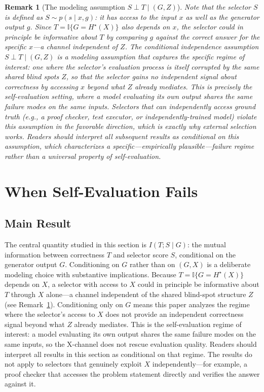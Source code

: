 \documentclass[11pt]{article}
\newtheorem{remark}[theorem]{Remark}
\begin{document}
\begin{remark}[The modeling assumption $S \perp T \mid (G, Z)$]
\label{rem:ci_assumption}
Note that the selector $S$ is defined as $S \sim p(s \mid x, g)$: it has access to the
input $x$ as well as the generator output $g$. Since $T = \mathbb{I}\{G = H^\star(X)\}$
also depends on $x$, the selector could in principle be informative about $T$ by comparing
$g$ against the correct answer for the specific $x$---a channel independent of $Z$. The
conditional independence assumption $S \perp T \mid (G, Z)$ is a \emph{modeling assumption}
that captures the specific regime of interest: one where the selector's evaluation process
is itself corrupted by the same shared blind spots $Z$, so that the selector gains no
independent signal about correctness by accessing $x$ beyond what $Z$ already mediates.
This is precisely the self-evaluation setting, where a model evaluating its own output
shares the same failure modes on the same inputs. Selectors that can independently access
ground truth (e.g., a proof checker, test executor, or independently-trained model) violate
this assumption in the favorable direction, which is exactly why external selection works.
Readers should interpret all subsequent results as conditional on this assumption, which
characterizes a specific---empirically plausible---failure regime rather than a universal
property of self-evaluation.
\end{remark}

\section{When Self-Evaluation Fails}
\label{sec:self_eval_fails}

\subsection{Main Result}

The central quantity studied in this section is $I(T; S \mid G)$: the mutual information
between correctness $T$ and selector score $S$, conditional on the generator output $G$.
Conditioning on $G$ rather than on $(G, X)$ is a deliberate modeling choice with substantive
implications. Because $T = \mathbb{I}\{G = H^\star(X)\}$ depends on $X$, a selector with
access to $X$ could in principle be informative about $T$ through $X$ alone---a channel
independent of the shared blind-spot structure $Z$ (see Remark~\ref{rem:ci_assumption}).
Conditioning only on $G$ means this paper analyzes the regime where the selector's access
to $X$ does not provide an independent correctness signal beyond what $Z$ already mediates.
This is the self-evaluation regime of interest: a model evaluating its own output shares the
same failure modes on the same inputs, so the X-channel does not rescue evaluation quality.
Readers should interpret all results in this section as conditional on that regime. The
results do not apply to selectors that genuinely exploit $X$ independently---for example, a
proof checker that accesses the problem statement directly and verifies the answer against it.
\end{document}
